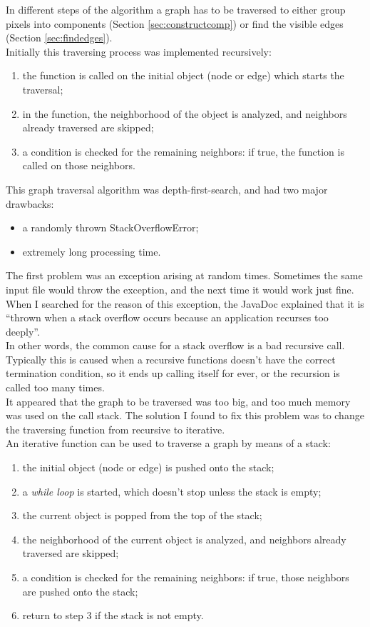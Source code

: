 \documentclass[]{usiinfbachelorproject}
\begin{document}
In different steps of the algorithm a graph has to be traversed to either group pixels into components (Section \ref{sec:constructcomp}) or find the visible edges (Section \ref{sec:findedges}).\\
Initially this traversing process was implemented recursively:
\begin{enumerate}
	\item the function is called on the initial object (node or edge) which starts the traversal;
	\item in the function, the neighborhood of the object is analyzed, and neighbors already traversed are skipped;
	\item a condition is checked for the remaining neighbors: if true, the function is called on those neighbors.
\end{enumerate}
This graph traversal algorithm was depth-first-search, and had two major drawbacks:
\begin{itemize}
	\item a randomly thrown StackOverflowError;
	\item extremely long processing time.
\end{itemize}
The first problem was an exception arising at random times. Sometimes the same input file would throw the exception, and the next time it would work just fine. When I searched for the reason of this exception, the JavaDoc explained that it is ``thrown when a stack overflow occurs because an application recurses too deeply''.\\
In other words, the common cause for a stack overflow is a bad recursive call. Typically this is caused when a recursive functions doesn't have the correct termination condition, so it ends up calling itself for ever, or the recursion is called too many times.\\
It appeared that the graph to be traversed was too big, and too much memory was used on the call stack. The solution I found to fix this problem was to change the traversing function from recursive to iterative.\\
An iterative function can be used to traverse a graph by means of a stack:
\begin{enumerate}
	\item the initial object (node or edge) is pushed onto the stack;
	\item a \emph{while loop} is started, which doesn't stop unless the stack is empty;
	\item \quad\quad the current object is popped from the top of the stack;
	\item \quad\quad the neighborhood of the current object is analyzed, and neighbors already traversed are skipped;
	\item \quad\quad a condition is checked for the remaining neighbors: if true, those neighbors are pushed onto the stack;
	\item \quad\quad return to step 3 if the stack is not empty.
\end{enumerate}
\end{document}
